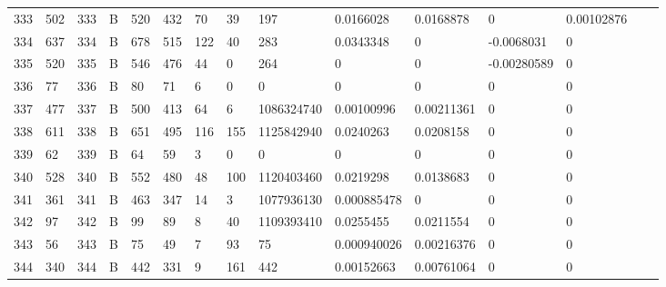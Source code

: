 \begin{longtable}{lllllllllllllll}
	333 & 502               & 333 & B   & 520               & 432               & 70                & 39   & 197        & 0.0166028      & 0.0168878      & 0             & 0.00102876   \\
	334 & 637               & 334 & B   & 678               & 515               & 122               & 40   & 283        & 0.0343348      & 0              & -0.0068031    & 0            \\
	335 & 520               & 335 & B   & 546               & 476               & 44                & 0    & 264        & 0              & 0              & -0.00280589   & 0            \\
	336 & 77                & 336 & B   & 80                & 71                & 6                 & 0    & 0          & 0              & 0              & 0             & 0            \\
	337 & 477               & 337 & B   & 500               & 413               & 64                & 6    & 1086324740 & 0.00100996     & 0.00211361     & 0             & 0            \\
	338 & 611               & 338 & B   & 651               & 495               & 116               & 155  & 1125842940 & 0.0240263      & 0.0208158      & 0             & 0            \\
	339 & 62                & 339 & B   & 64                & 59                & 3                 & 0    & 0          & 0              & 0              & 0             & 0            \\
	340 & 528               & 340 & B   & 552               & 480               & 48                & 100  & 1120403460 & 0.0219298      & 0.0138683      & 0             & 0            \\
	341 & 361               & 341 & B   & 463               & 347               & 14                & 3    & 1077936130 & 0.000885478    & 0              & 0             & 0            \\
	342 & 97                & 342 & B   & 99                & 89                & 8                 & 40   & 1109393410 & 0.0255455      & 0.0211554      & 0             & 0            \\
	343 & 56                & 343 & B   & 75                & 49                & 7                 & 93   & 75         & 0.000940026    & 0.00216376     & 0             & 0            \\
	344 & 340               & 344 & B   & 442               & 331               & 9                 & 161  & 442        & 0.00152663     & 0.00761064     & 0             & 0            \\

\end{longtable}
